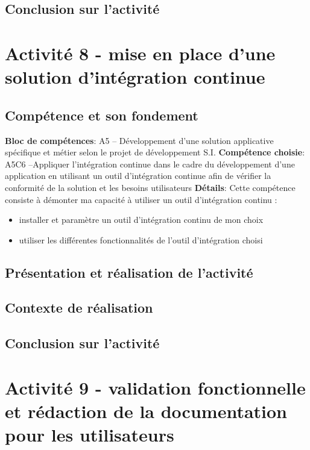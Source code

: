 \documentclass[a4paper, 11pt]{report}
\begin{document}
\subsection{Conclusion sur l'activité}

\section{Activité 8 - mise en place d’une solution d’intégration continue}
\subsection{Compétence et son fondement}
\textbf{Bloc de compétences}: A5 – Développement d’une solution applicative spécifique et métier selon le projet de développement S.I.
\newline
\textbf{Compétence choisie}: A5C6 –Appliquer l’intégration continue dans le cadre du développement d’une application en utilisant un outil d’intégration continue afin de vérifier la conformité de la solution et les besoins utilisateurs
\newline
\textbf{Détails}: Cette compétence consiste à démonter ma capacité à utiliser un outil d’intégration continu :
\begin{itemize}
  \item installer et paramètre un outil d’intégration continu de mon choix
  \item utiliser les différentes fonctionnalités de l’outil d’intégration choisi
\end{itemize}
\subsection{Présentation et réalisation de l'activité}
\subsection{Contexte de réalisation}
\subsection{Conclusion sur l'activité}

\section{Activité 9 - validation fonctionnelle et rédaction de la documentation pour les utilisateurs}
\end{document}
